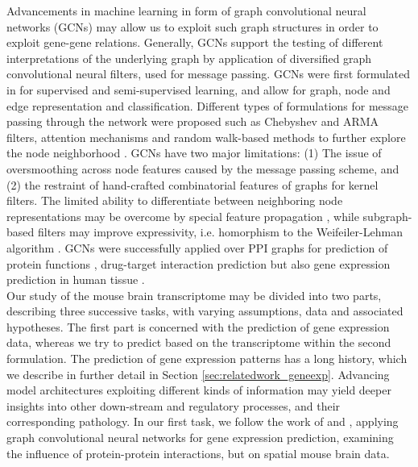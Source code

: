 \documentclass[]{article}
\renewcommand{\cite}{\citep}
\begin{document}
Advancements in machine learning in form of graph convolutional neural networks (GCNs) may allow us to exploit such graph structures in order to exploit gene-gene relations. Generally, GCNs support the testing of different interpretations of the underlying graph by application of diversified graph convolutional neural filters, used for message passing. GCNs were first formulated in \citet{GCNConv} for supervised and semi-supervised learning, and allow for graph, node and edge representation and classification. Different types of formulations for message passing through the network were proposed such as Chebyshev \cite{ChebConv} and ARMA \cite{ArmaConv} filters, attention mechanisms \cite{GATConv} and random walk-based methods to further explore the node neighborhood \cite{APPNPConv, SAGEConv}. GCNs have two major limitations: (1) The issue of oversmoothing across node features caused by the message passing scheme, and (2) the restraint of hand-crafted combinatorial features of graphs for kernel filters. The limited ability to differentiate between neighboring node representations may be overcome by special feature propagation \cite{GENConv2020}, while subgraph-based filters \citet{feng2022kergnns} may improve expressivity, i.e. homorphism to the Weifeiler-Lehman algorithm \cite{leman1968reduction}. 
GCNs were successfully applied over PPI graphs for prediction of protein functions \cite{Zitnik2017}, drug-target interaction prediction \cite{hinnerichs2021dti} but also gene expression prediction in human tissue \cite{schulte2021integration, wang2021mogonet}.\\ 

Our study of the mouse brain transcriptome may be divided into two parts, describing three successive tasks, with varying assumptions, data and associated hypotheses. 
The first part is concerned with the prediction of gene expression data, whereas we try to predict based on the transcriptome within the second formulation. 
The prediction of gene expression patterns has a long history, which we describe in further detail in Section \ref{sec:relatedwork_geneexp}. Advancing model architectures exploiting different kinds of information may yield deeper insights into other down-stream and regulatory processes, and their corresponding pathology. In our first task, we follow the work of \citet{wang2021mogonet} and \citet{schulte2021integration}, applying graph convolutional neural networks for gene expression prediction, examining the influence of protein-protein interactions, but on spatial mouse brain data.\\
\end{document}
